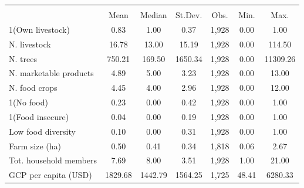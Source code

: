 {
\def\sym#1{\ifmmode^{#1}\else\(^{#1}\)\fi}
\begin{tabular}{l*{1}{cccccc}}
\toprule
                &\multicolumn{6}{c}{}                                       \\
                &   {Mean}& {Median}&{St.Dev.}&   {Obs.}&   {Min.}&   {Max.}\\
\midrule
1(Own livestock)&     0.83&     1.00&     0.37&    1,928&     0.00&     1.00\\
N. livestock    &    16.78&    13.00&    15.19&    1,928&     0.00&   114.50\\
N. trees        &   750.21&   169.50&  1650.34&    1,928&     0.00& 11309.26\\
N. marketable products&     4.89&     5.00&     3.23&    1,928&     0.00&    13.00\\
N. food crops   &     4.45&     4.00&     2.96&    1,928&     0.00&    12.00\\
1(No food)      &     0.23&     0.00&     0.42&    1,928&     0.00&     1.00\\
1(Food insecure)&     0.04&     0.00&     0.19&    1,928&     0.00&     1.00\\
Low food diversity&     0.10&     0.00&     0.31&    1,928&     0.00&     1.00\\
Farm size (ha)  &     0.50&     0.41&     0.34&    1,818&     0.06&     2.67\\
Tot. household members&     7.69&     8.00&     3.51&    1,928&     1.00&    21.00\\
GCP per capita (USD)&  1829.68&  1442.79&  1564.25&    1,725&    48.41&  6280.33\\
\bottomrule
\end{tabular}
}
